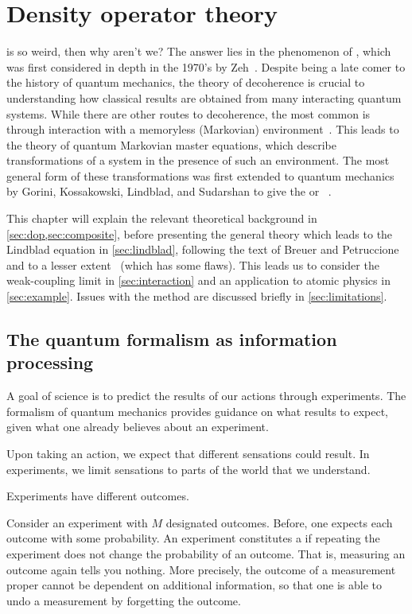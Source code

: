 \documentclass[../thesis.tex]{subfiles}
\begin{document}
\chapter{Density operator theory}

 is so weird, then why aren't we? The answer
lies in the phenomenon of , which was first considered in
depth in the 1970's by Zeh~\cite{zeh}. Despite being a late comer to the history
of quantum mechanics, the theory of decoherence is crucial to understanding how
classical results are obtained from many interacting quantum systems. While
there are other routes to decoherence, the most common is through interaction
with a memoryless (Markovian) environment~\cite{decoherence}. This leads to the
theory of quantum Markovian master equations, which describe transformations of
a system in the presence of such an environment. The most general form of these
transformations was first extended to quantum mechanics by Gorini, Kossakowski,
Lindblad, and Sudarshan to give the \textsc{} or ~\cite{gks,lindblad}.

This chapter will explain the relevant theoretical background in
\cref{sec:dop,sec:composite}, before presenting the general theory which leads
to the Lindblad equation in \cref{sec:lindblad}, following the text of Breuer
and Petruccione~\cite{opensys} and to a lesser extent~\cite{intro} (which has
some flaws). This leads us to consider the weak-coupling limit in
\cref{sec:interaction} and an application to atomic physics in
\cref{sec:example}. Issues with the method are discussed briefly in
\cref{sec:limitations}.

\section{The quantum formalism as information processing}\label{sec:dop-info}

A goal of science is to predict the results of our actions through experiments.
The formalism of quantum mechanics provides guidance on what results to expect,
given what one already believes about an experiment.

Upon taking an action, we expect that different sensations could result. In
experiments, we limit sensations to parts of the world that we understand.

Experiments have different outcomes.

Consider an experiment with $M$ designated outcomes. Before, one expects each
outcome with some probability. An experiment constitutes a  if
repeating the experiment does not change the probability of an outcome. That is,
measuring an outcome again tells you nothing. More precisely, the outcome of a
measurement proper cannot be dependent on additional information, so that one is
able to undo a measurement by forgetting the outcome.
\end{document}
